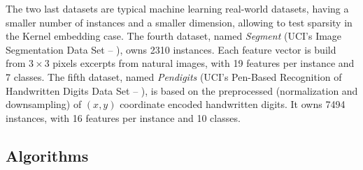 \documentclass[preprint,12pt,authoryear]{elsarticle}
\begin{document}

The two last datasets are typical machine learning real-world datasets, having a smaller number of instances and a smaller dimension, allowing to test sparsity in the Kernel embedding case.   
The fourth dataset, named  \textit{Segment} (UCI's Image Segmentation Data Set -- \cite{Lichman:2013}), owns 2310 instances. Each feature vector is build from $3\times3$ pixels excerpts from natural images, with 19 features per instance and 7 classes. 
The fifth dataset, named \textit{Pendigits} (UCI's Pen-Based Recognition of Handwritten Digits Data Set -- \cite{alimoglu1996combining}), is based on the preprocessed (normalization and downsampling) of $(x,y)$ coordinate encoded handwritten digits. It owns 7494 instances, with 16 features per instance and 10 classes. 




\subsection{Algorithms}
\end{document}
